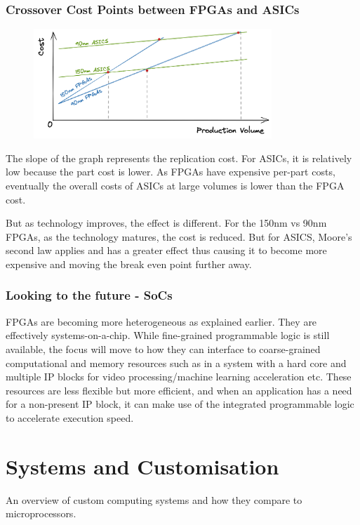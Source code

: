 \documentclass[a4paper]{scrartcl}
\begin{document}
\subsubsection{Crossover Cost Points between FPGAs and ASICs}
\begin{figure}[H]
    \centering
    \includegraphics[width=0.8\textwidth]{figures/L1-CrossoverCost.png}
\end{figure}
The slope of the graph represents the replication cost. For ASICs, it is relatively low
because the part cost is lower. As FPGAs have expensive per-part costs, eventually the
overall costs of ASICs at large volumes is lower than the FPGA cost. 

But as technology improves, the effect is different. For the 150nm vs 90nm FPGAs, 
as the technology matures, the cost is reduced. But for ASICS, Moore's second law
applies and has a greater effect thus causing it to become more expensive and moving
the break even point further away. 

\subsubsection{Looking to the future - SoCs}
FPGAs are becoming more heterogeneous as explained earlier. They are
effectively systems-on-a-chip. While fine-grained programmable logic is still
available, the focus will move to how they can interface to coarse-grained
computational and memory resources such as in a system with a hard core and multiple
IP blocks for video processing/machine learning acceleration etc. 
These resources are less flexible but more efficient, and when an application has 
a need for a non-present IP block, it can make use of the integrated programmable
logic to accelerate execution speed. 

\section{Systems and Customisation}
An overview of custom computing systems and how they compare to microprocessors. 
\end{document}
